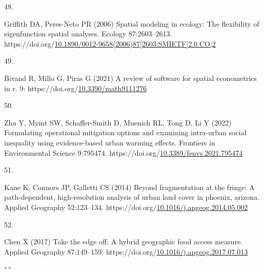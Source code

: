 \documentclass[
  sn-basic,
]{sn-jnl}
\newlength{\cslhangindent}
\newlength{\csllabelwidth}
\newenvironment{CSLReferences}[2] %
 {\begin{list}{}{%
  \setlength{\itemindent}{0pt}
  \setlength{\leftmargin}{0pt}
  \setlength{\parsep}{0pt}
  \ifodd #1
   \setlength{\leftmargin}{\cslhangindent}
   \setlength{\itemindent}{-1\cslhangindent}
  \fi
  \setlength{\itemsep}{#2\baselineskip}}}
 {\end{list}}
\newcommand{\CSLLeftMargin}[1]{\parbox[t]{\csllabelwidth}{\strut#1\strut}}
\newcommand{\CSLRightInline}[1]{\parbox[t]{\linewidth - \csllabelwidth}{\strut#1\strut}}
\begin{document}
\begin{CSLReferences}{0}{1}
\CSLLeftMargin{48. }%
\CSLRightInline{Griffith DA, Peres-Neto PR (2006) Spatial modeling in
ecology: The flexibility of eigenfunction spatial analyses. Ecology
87:2603--2613.
https://doi.org/\href{https://doi.org/10.1890/0012-9658(2006)87\%5B2603:SMIETF\%5D2.0.CO;2}{10.1890/0012-9658(2006)87{[}2603:SMIETF{]}2.0.CO;2}}

\CSLLeftMargin{49. }%
\CSLRightInline{Bivand R, Millo G, Piras G (2021) A review of software
for spatial econometrics in {\textbraceleft}r{\textbraceright}. 9:
https://doi.org/\href{https://doi.org/10.3390/math9111276}{10.3390/math9111276}}

\CSLLeftMargin{50. }%
\CSLRightInline{Zhu Y, Myint SW, Schaffer-Smith D, Muenich RL, Tong D,
Li Y (2022) Formulating operational mitigation options and examining
intra-urban social inequality using evidence-based urban warming
effects. Frontiers in Environmental Science 9:795474.
https://doi.org/\href{https://doi.org/10.3389/fenvs.2021.795474}{10.3389/fenvs.2021.795474}}

\CSLLeftMargin{51. }%
\CSLRightInline{Kane K, Connors JP, Galletti CS (2014) Beyond
fragmentation at the fringe: A path-dependent, high-resolution analysis
of urban land cover in phoenix, arizona. Applied Geography 52:123--134.
https://doi.org/\href{https://doi.org/10.1016/j.apgeog.2014.05.002}{10.1016/j.apgeog.2014.05.002}}

\CSLLeftMargin{52. }%
\CSLRightInline{Chen X (2017) Take the edge off: A hybrid geographic
food access measure. Applied Geography 87:149--159.
https://doi.org/\href{https://doi.org/10.1016/j.apgeog.2017.07.013}{10.1016/j.apgeog.2017.07.013}}

\end{CSLReferences}

````
\end{document}
